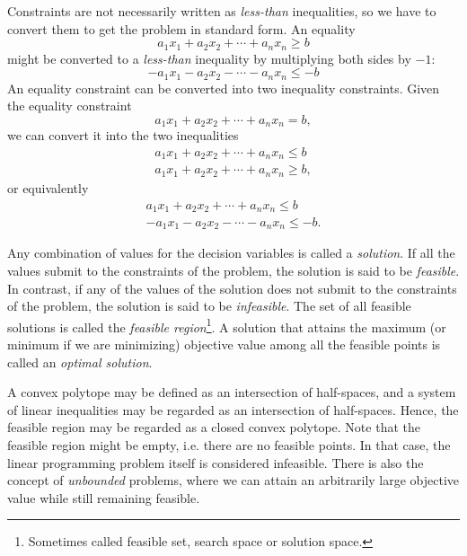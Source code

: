 Constraints are not necessarily written as
\textit{less-than} inequalities, so we have to convert them to get the problem
in standard form. An equality
\[
a_1 x_1 + a_2 x_2 + \cdots + a_n x_n \geq b
\]
might be converted to a \textit{less-than} inequality by multiplying both
sides by $-1$:
\[
- a_1 x_1 - a_2 x_2 - \cdots - a_n x_n \leq -b
\]
An equality constraint can be converted into two inequality constraints.
Given the equality constraint
\[
a_1 x_1 + a_2 x_2 + \cdots + a_n x_n = b,
\]
we can convert it into the two inequalities
\[
\begin{array}{c}
a_1 x_1 + a_2 x_2 + \cdots + a_n x_n \leq b \\
a_1 x_1 + a_2 x_2 + \cdots + a_n x_n \geq b,
\end{array}
\]
or equivalently
\[
\begin{array}{c}
a_1 x_1 + a_2 x_2 + \cdots + a_n x_n \leq b \\
- a_1 x_1 - a_2 x_2 - \cdots - a_n x_n \leq -b.
\end{array}
\]

Any combination of values for the decision variables is called a \textit{solution}.
If all the values submit to the constraints of the problem, the solution is
said to be \textit{feasible}. In contrast, if any of the values of the solution
does not submit to the constraints of the problem, the solution is said to
be \textit{infeasible}. The set of all feasible solutions is called the
\textit{feasible region}\footnote{Sometimes called feasible set,
search space or solution space.}\cite{nocedal}. A solution that attains
the maximum (or minimum if we are minimizing) objective value among all
the feasible points is called an \textit{optimal solution}.

A convex polytope may be defined as an intersection of half-spaces, and a system
of linear inequalities may be regarded as an intersection of half-spaces\cite{branko}.
Hence, the feasible region may be regarded as a closed convex polytope.
Note that the feasible region might be empty, i.e. there are no feasible points.
In that case, the linear programming problem itself is considered infeasible.
There is also the concept of \textit{unbounded} problems, where we can attain
an arbitrarily large objective value while still remaining feasible.

